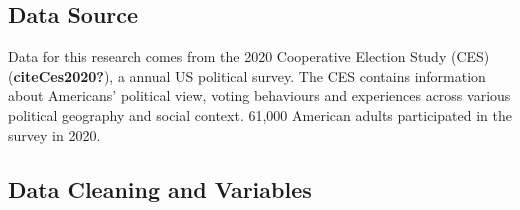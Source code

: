 \documentclass[
  letterpaper,
  DIV=11,
  numbers=noendperiod]{scrartcl}
\begin{document}
\hypertarget{data-source}{%
\subsection{Data Source}\label{data-source}}

Data for this research comes from the 2020 Cooperative Election Study
(CES) (\textbf{citeCes2020?}), a annual US political survey. The CES
contains information about Americans' political view, voting behaviours
and experiences across various political geography and social context.
61,000 American adults participated in the survey in 2020.

\hypertarget{data-cleaning-and-variables}{%
\subsection{Data Cleaning and
Variables}\label{data-cleaning-and-variables}}
\end{document}
